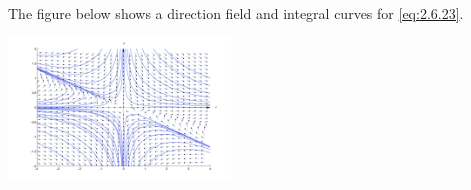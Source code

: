 \documentclass{ximera}
\begin{document}
\begin{example}
\begin{explanation}
The figure below shows a direction field and integral curves for
\eqref{eq:2.6.23}.


\begin{image}
\includegraphics[height=1.5in]{fig020603.jpg}
\end{image}

\end{explanation}
\end{example}
\end{document}
